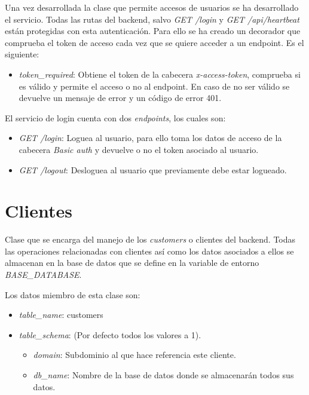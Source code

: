 Una vez desarrollada la clase que permite accesos de usuarios se ha desarrollado el servicio. Todas las rutas del backend, salvo \textit{GET /login} y \textit{GET /api/heartbeat} están protegidas con esta autenticación. Para ello se ha creado un decorador que comprueba el token de acceso cada vez que se quiere acceder a un endpoint. Es el siguiente:
\begin{itemize}
	\item \textit{token\_required}: Obtiene el token de la cabecera \textit{x-access-token}, comprueba si es válido y permite el acceso o no al endpoint. En caso de no ser válido se devuelve un mensaje de error y un código de error 401.
\end{itemize}


\bigskip
El servicio de login cuenta con dos \textit{endpoints}, los cuales son:
\begin{itemize}
	\item \textit{GET /login}: Loguea al usuario, para ello toma los datos de acceso de la cabecera \textit{Basic auth} y devuelve o no el token asociado al usuario.
	\item \textit{GET /logout}: Desloguea al usuario que previamente debe estar logueado.
\end{itemize}




\section{Clientes}

Clase que se encarga del manejo de los \textit{customers} o clientes del backend. Todas las operaciones relacionadas con clientes así como los datos asociados a ellos se almacenan en la base de datos que se define en la variable de entorno \textit{BASE\_DATABASE}.

\bigskip
Los datos miembro de esta clase son:
\begin{itemize}
	\item \textit{table\_name}: customers
	\item \textit{table\_schema}: (Por defecto todos los valores a 1).
	\begin{itemize}
		\item \textit{domain}: Subdominio al que hace referencia este cliente.
		\item \textit{db\_name}: Nombre de la base de datos donde se almacenarán todos sus datos.
	\end{itemize}
\end{itemize}


